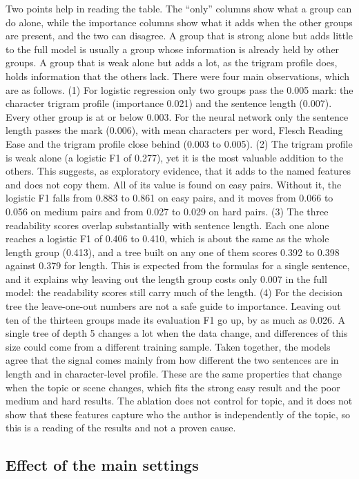 \documentclass[runningheads]{llncs}
\begin{document}
Two points help in reading the table. The ``only'' columns show what a group can do alone, while the importance columns show what it adds when the other groups are present, and the two can disagree. A group that is strong alone but adds little to the full model is usually a group whose information is already held by other groups. A group that is weak alone but adds a lot, as the trigram profile does, holds information that the others lack. There were four main observations, which are as follows. (1) For logistic regression only two groups pass the 0.005 mark: the character trigram profile (importance 0.021) and the sentence length (0.007). Every other group is at or below 0.003. For the neural network only the sentence length passes the mark (0.006), with mean characters per word, Flesch Reading Ease and the trigram profile close behind (0.003 to 0.005). (2) The trigram profile is weak alone (a logistic F1 of 0.277), yet it is the most valuable addition to the others. This suggests, as exploratory evidence, that it adds to the named features and does not copy them. All of its value is found on easy pairs. Without it, the logistic F1 falls from 0.883 to 0.861 on easy pairs, and it moves from 0.066 to 0.056 on medium pairs and from 0.027 to 0.029 on hard pairs. (3) The three readability scores overlap substantially with sentence length. Each one alone reaches a logistic F1 of 0.406 to 0.410, which is about the same as the whole length group (0.413), and a tree built on any one of them scores 0.392 to 0.398 against 0.379 for length. This is expected from the formulas for a single sentence, and it explains why leaving out the length group costs only 0.007 in the full model: the readability scores still carry much of the length. (4) For the decision tree the leave-one-out numbers are not a safe guide to importance. Leaving out ten of the thirteen groups made its evaluation F1 go up, by as much as 0.026. A single tree of depth 5 changes a lot when the data change, and differences of this size could come from a different training sample. Taken together, the models agree that the signal comes mainly from how different the two sentences are in length and in character-level profile. These are the same properties that change when the topic or scene changes, which fits the strong easy result and the poor medium and hard results. The ablation does not control for topic, and it does not show that these features capture who the author is independently of the topic, so this is a reading of the results and not a proven cause.

\subsection{Effect of the main settings}
\end{document}
